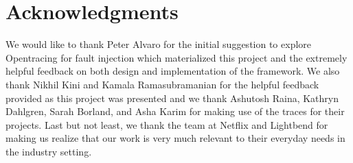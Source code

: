 \documentclass[letterpaper,twocolumn,10pt]{article}
\begin{document}








\section{Acknowledgments}
We would like to thank Peter Alvaro for the initial suggestion to explore Opentracing for fault injection which materialized this project and the extremely helpful feedback on both design and implementation of the framework. We also thank Nikhil Kini and Kamala Ramasubramanian for the helpful feedback provided as this project was presented and we thank Ashutosh Raina, Kathryn Dahlgren, Sarah Borland, and Asha Karim for making use of the traces for their projects. Last but not least, we thank the team at Netflix and Lightbend for making us realize that our work is very much relevant to their everyday needs in the industry setting.



\end{document}
